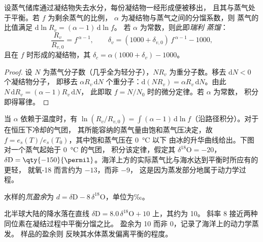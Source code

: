 \begin{proposition}[瑞利蒸馏]\label{prop:b3:stable-isotopes:rayleigh-distillation}
设蒸气储库通过凝结物失去水分，每份凝结物一经形成便被移出，
且其与蒸气处于平衡。若 $f$ 为剩余蒸气的比例，
$\alpha$ 为凝结物与蒸气之间的分馏系数，则
蒸气的比值满足 $\mathrm d\ln R_v = (\alpha - 1)\,\mathrm d\ln f$。
若 $\alpha$ 为常数，则此即\emph{瑞利
蒸馏}：
\[
\frac{R_v}{R_{v,0}} = f^{\,\alpha - 1}, \qquad
\delta_v = (1000 + \delta_{v,0})\,f^{\,\alpha - 1} - 1000,
\]
且在 $f$ 时形成的凝结物，其 $\delta_c = \alpha(1000 + \delta_v) - 1000$。
\end{proposition}

\begin{proof}
设 $N$ 为蒸气分子数（几乎全为轻分子），$N R_v$
为重分子数。移去 $\mathrm dN < 0$ 个凝结物分子，
即移去 $\alpha R_v\,\mathrm dN$ 个重分子：$\mathrm d(NR_v) = \alpha
R_v\,\mathrm dN$。由此 $N\,\mathrm dR_v = (\alpha - 1)R_v\,\mathrm dN$，
此即取 $f = N/N_0$ 时的微分定律。若 $\alpha$ 为常数，
积分即得幂律。
\end{proof}

当 $\alpha$ 依赖于温度时，有 $\ln(R_v/R_{v,0}) = \int(\alpha - 1)\,
\mathrm d\ln f$（沿路径积分）。对于在恒压下冷却的气团，
其所能容纳的蒸气量由饱和蒸气压决定，故 $f =
e_s(T)/e_s(T_0)$，其中饱和蒸气压在 \qty{0}{\celsius} 以下
由冰的升华曲线给出。下图对一个蒸气起始于 \qty{0}{\celsius} 的气团，
积分该定律，假定其 $\delta^{18}\mathrm O = -20$，
$\delta\mathrm D = \qty{-150}{\permil}$。海洋上方的实际蒸气比与海水达到平衡时所应有的更轻，
就氧-18 而言约为 $-13$，而非 \qty{-9}{\permil}，
这是因为蒸发部分地属于动力学过程。

\begin{definition}[氘盈余]\label{def:b3:stable-isotopes:d-excess}
水样的\emph{氘盈余}为 $d =
\delta\mathrm D - 8\,\delta^{18}\mathrm O$，单位为‰。
\end{definition}

北半球大陆的降水落在直线
$\delta\mathrm D = 8.0\,\delta^{18}\mathrm O + 10$ 上，其约为 \qty{10}{\permil}。
斜率 8 接近两种同位素在凝结过程中平衡分馏之比。
盈余为 10 而非 0，记录了海洋上的动力学蒸发。
样品的盈余则
反映其水体蒸发偏离平衡的程度。

